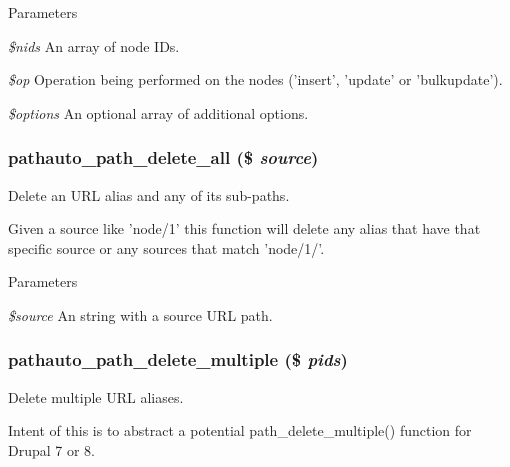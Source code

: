 \begin{DoxyParams}{Parameters}
\item[{\em \$nids}]An array of node IDs. \item[{\em \$op}]Operation being performed on the nodes ('insert', 'update' or 'bulkupdate'). \item[{\em \$options}]An optional array of additional options. \end{DoxyParams}
\hypertarget{pathauto_8module_a5c4f73a894903516d1caecaf4f235378}{
\subsubsection[{pathauto\_\-path\_\-delete\_\-all}]{\setlength{\rightskip}{0pt plus 5cm}pathauto\_\-path\_\-delete\_\-all (\$ {\em source})}}
\label{pathauto_8module_a5c4f73a894903516d1caecaf4f235378}
Delete an URL alias and any of its sub-\/paths.

Given a source like 'node/1' this function will delete any alias that have that specific source or any sources that match 'node/1/'.


\begin{DoxyParams}{Parameters}
\item[{\em \$source}]An string with a source URL path. \end{DoxyParams}
\hypertarget{pathauto_8module_ae53404dbd7418362df6af153668af299}{
\subsubsection[{pathauto\_\-path\_\-delete\_\-multiple}]{\setlength{\rightskip}{0pt plus 5cm}pathauto\_\-path\_\-delete\_\-multiple (\$ {\em pids})}}
\label{pathauto_8module_ae53404dbd7418362df6af153668af299}
Delete multiple URL aliases.

Intent of this is to abstract a potential path\_\-delete\_\-multiple() function for Drupal 7 or 8.


